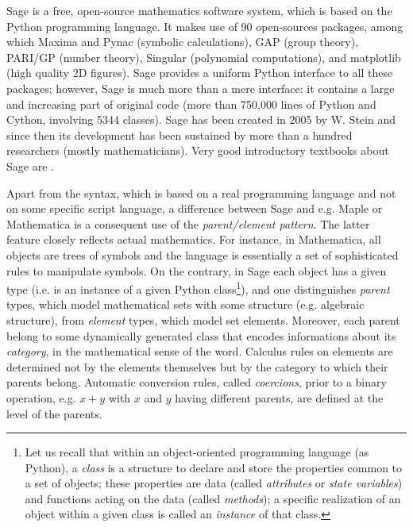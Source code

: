 \documentclass[a4paper]{jpconf}
\newcommand{\soft}[1]{\textsf{#1}}
\newcommand{\Sage}{\soft{Sage}}
\begin{document}
\Sage{} \cite{sage} is a free, open-source mathematics software system, which is
based on the Python programming language. It makes use of 90 open-sources packages, 
among which \soft{Maxima} and \soft{Pynac} (symbolic calculations),
\soft{GAP} (group theory), 
\soft{PARI/GP} (number theory), \soft{Singular} (polynomial computations), 
and \soft{matplotlib} (high quality 2D figures). 
\Sage{} provides a uniform Python interface to all these packages; however, 
\Sage{} is much more than a mere interface: it contains a large and increasing part of 
original code (more than 750,000 lines of Python and Cython, involving 5344 classes). 
\Sage{} has been created in 2005 by W. Stein \cite{SteinJ05} and since
then its development has been sustained by more than a hundred researchers
(mostly mathematicians). Very good introductory textbooks about \Sage{} are
\cite{JoyneS14,Zimme13,Bard15}. 
 
Apart from the syntax, which is based on a real programming language and not on some specific script 
language, a difference between \Sage{} and e.g. \soft{Maple} or \soft{Mathematica}
is a consequent use of the \emph{parent/element pattern}. The latter  
feature closely reflects actual mathematics. 
For instance, in \soft{Mathematica}, all objects 
are trees of symbols and the language is essentially a set of 
sophisticated rules to manipulate symbols. On the contrary, in \Sage{}
each object has a given type (i.e. is an instance of a given
Python class\footnote{Let us
recall that within an object-oriented programming language (as Python),
a \emph{class} is a structure to declare and store the
properties common to a set of objects; these properties 
are data (called 
\emph{attributes} or \emph{state variables}) and functions acting 
on the data (called \emph{methods}); a specific realization of an object 
within a given class is called an \emph{instance} of that class.}), 
and one distinguishes \emph{parent} types, which model mathematical
sets with some structure (e.g. algebraic structure), from \emph{element} types,
which model set elements. Moreover, each parent belong to some 
dynamically generated class that encodes informations 
about its \emph{category}, in the mathematical sense of the word.
Calculus rules on elements are determined not by the elements themselves
but by the category to which their parents belong. Automatic conversion rules, called \emph{coercions},
prior to a binary operation, e.g. $x+y$ with $x$ and $y$ having different 
parents, are defined at the level of the parents.
\end{document}
